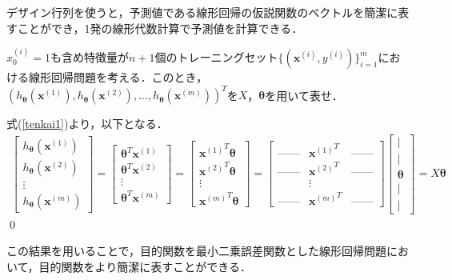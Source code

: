デザイン行列を使うと，予測値である線形回帰の仮説関数のベクトルを簡潔に表すことができ，1発の線形代数計算で予測値を計算できる．

\begin{qu}
$x_0^{(i)}=1$も含め特徴量が$n+1$個のトレーニングセット$\{({\bm x}^{(i)},y^{(i)})\}_{i=1}^m$における線形回帰問題を考える．このとき，$(h_{{\bm \theta}}({\bm x}^{(1)}),h_{{\bm \theta}}({\bm x}^{(2)}),\ldots,h_{{\bm \theta}}({\bm x}^{(m)}))^T$を$X$，${\bm \theta}$を用いて表せ．
\end{qu}
\begin{ans}
式(\ref{tenkai1})より，以下となる．
\begin{align}
\begin{bmatrix}
h_{{\bm \theta}}({\bm x}^{(1)}) \\
h_{{\bm \theta}}({\bm x}^{(2)}) \\
\vdots \\
h_{{\bm \theta}}({\bm x}^{(m)})
\end{bmatrix}
=
\begin{bmatrix}
{\bm \theta}^T{\bm x}^{(1)} \\
{\bm \theta}^T {\bm x}^{(2)}\\
\vdots \\
{\bm \theta}^T {\bm x}^{(m)}
\end{bmatrix}
=
\begin{bmatrix}
{{\bm x}^{(1)}}^T{\bm \theta} \\
{{\bm x}^{(2)}}^T{\bm \theta} \\
\vdots \\
{{\bm x}^{(m)}}^T{\bm \theta}
\end{bmatrix}
=
\begin{bmatrix}
\mbox{------} & {{\bm x}^{(1)}}^T & \mbox{------} \\
\mbox{------} & {{\bm x}^{(2)}}^T & \mbox{------} \\
 & \vdots & \\
\mbox{------} & {{\bm x}^{(m)}}^T & \mbox{------}
\end{bmatrix}
\begin{bmatrix}
| \\[-2pt]
| \\
{\bm \theta} \\
| \\[-2pt]
|
\end{bmatrix}
=X {\bm \theta} \label{lr_hypo}
\end{align}
\qed
\end{ans}

この結果を用いることで，目的関数を最小二乗誤差関数とした線形回帰問題において，目的関数をより簡潔に表すことができる．

